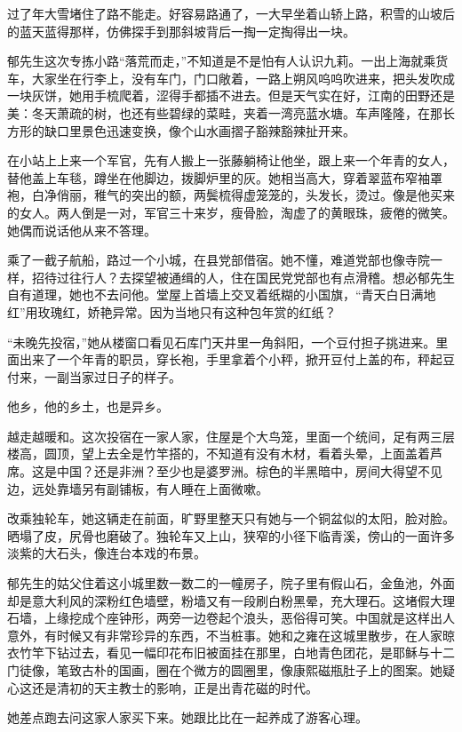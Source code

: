 \par 过了年大雪堵住了路不能走。好容易路通了，一大早坐着山轿上路，积雪的山坡后的蓝天蓝得那样，仿佛探手到那斜坡背后一掏一定掏得出一块。
\par 郁先生这次专拣小路“落荒而走，”不知道是不是怕有人认识九莉。一出上海就乘货车，大家坐在行李上，没有车门，门口敞着，一路上朔风呜呜吹进来，把头发吹成一块灰饼，她用手梳爬着，涩得手都插不进去。但是天气实在好，江南的田野还是美：冬天萧疏的树，也还有些碧绿的菜畦，夹着一湾亮蓝水塘。车声隆隆，在那长方形的缺口里景色迅速变换，像个山水画摺子豁辣豁辣扯开来。
\par 在小站上上来一个军官，先有人搬上一张藤躺椅让他坐，跟上来一个年青的女人，替他盖上车毯，蹲坐在他脚边，拨脚炉里的灰。她相当高大，穿着翠蓝布窄袖罩袍，白净俏丽，稚气的突出的额，两鬓梳得虚笼笼的，头发长，烫过。像是他买来的女人。两人倒是一对，军官三十来岁，瘦骨脸，淘虚了的黄眼珠，疲倦的微笑。她偶而说话他从来不答理。
\par 乘了一截子航船，路过一个小城，在县党部借宿。她不懂，难道党部也像寺院一样，招待过往行人？去探望被通缉的人，住在国民党党部也有点滑稽。想必郁先生自有道理，她也不去问他。堂屋上首墙上交叉着纸糊的小国旗，“青天白日满地红”用玫瑰红，娇艳异常。因为当地只有这种包年赏的红纸？
\par “未晚先投宿，”她从楼窗口看见石库门天井里一角斜阳，一个豆付担子挑进来。里面出来了一个年青的职员，穿长袍，手里拿着个小秤，掀开豆付上盖的布，秤起豆付来，一副当家过日子的样子。
\par 他乡，他的乡土，也是异乡。
\par 越走越暖和。这次投宿在一家人家，住屋是个大鸟笼，里面一个统间，足有两三层楼高，圆顶，望上去全是竹竿搭的，不知道有没有木材，看着头晕，上面盖着芦席。这是中国？还是非洲？至少也是婆罗洲。棕色的半黑暗中，房间大得望不见边，远处靠墙另有副铺板，有人睡在上面微嗽。
\par 改乘独轮车，她这辆走在前面，旷野里整天只有她与一个铜盆似的太阳，脸对脸。晒塌了皮，尻骨也磨破了。独轮车又上山，狭窄的小径下临青溪，傍山的一面许多淡紫的大石头，像连台本戏的布景。
\par 郁先生的姑父住着这小城里数一数二的一幢房子，院子里有假山石，金鱼池，外面却是意大利风的深粉红色墙壁，粉墙又有一段刷白粉黑晕，充大理石。这堵假大理石墙，上缘挖成个座钟形，两旁一边卷起个浪头，恶俗得可笑。中国就是这样出人意外，有时候又有非常珍异的东西，不当桩事。她和之雍在这城里散步，在人家晾衣竹竿下钻过去，看见一幅印花布旧被面挂在那里，白地青色团花，是耶稣与十二门徒像，笔致古朴的国画，圈在个微方的圆圈里，像康熙磁瓶肚子上的图案。她疑心这还是清初的天主教士的影响，正是出青花磁的时代。
\par 她差点跑去问这家人家买下来。她跟比比在一起养成了游客心理。
